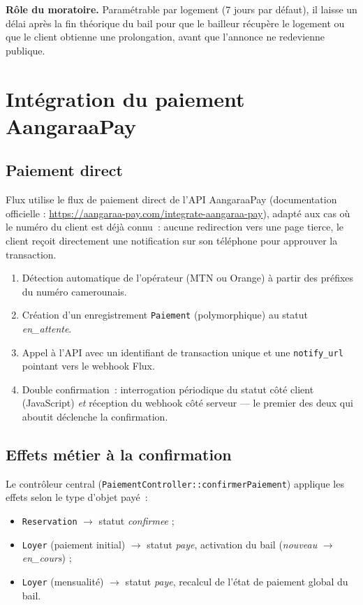 \documentclass[11pt,a4paper]{report}
\newcommand{\tech}[1]{\texttt{\small #1}}
\begin{document}
\begin{noteflux}
\textbf{Rôle du moratoire.} Paramétrable par logement (7 jours par défaut), il laisse un délai après la fin théorique du bail pour que le bailleur récupère le logement ou que le client obtienne une prolongation, avant que l'annonce ne redevienne publique.
\end{noteflux}

\chapter{Intégration du paiement AangaraaPay}

\section{Paiement direct}
Flux utilise le flux de paiement \og direct \fg{} de l'API AangaraaPay (documentation officielle : \url{https://aangaraa-pay.com/integrate-aangaraa-pay}), adapté aux cas où le numéro du client est déjà connu~: aucune redirection vers une page tierce, le client reçoit directement une notification sur son téléphone pour approuver la transaction.

\begin{enumerate}[leftmargin=1.2cm]
    \item Détection automatique de l'opérateur (MTN ou Orange) à partir des préfixes du numéro camerounais.
    \item Création d'un enregistrement \tech{Paiement} (polymorphique) au statut \emph{en\_attente}.
    \item Appel à l'API avec un identifiant de transaction unique et une \tech{notify\_url} pointant vers le webhook Flux.
    \item Double confirmation~: interrogation périodique du statut côté client (JavaScript) \emph{et} réception du webhook côté serveur --- le premier des deux qui aboutit déclenche la confirmation.
\end{enumerate}

\section{Effets métier à la confirmation}
Le contrôleur central (\tech{PaiementController::confirmerPaiement}) applique les effets selon le type d'objet payé~:
\begin{itemize}[leftmargin=1.2cm]
    \item \tech{Reservation} $\rightarrow$ statut \emph{confirmee} ;
    \item \tech{Loyer} (paiement initial) $\rightarrow$ statut \emph{paye}, activation du bail (\emph{nouveau} $\rightarrow$ \emph{en\_cours}) ;
    \item \tech{Loyer} (mensualité) $\rightarrow$ statut \emph{paye}, recalcul de l'état de paiement global du bail.
\end{itemize}
\end{document}
